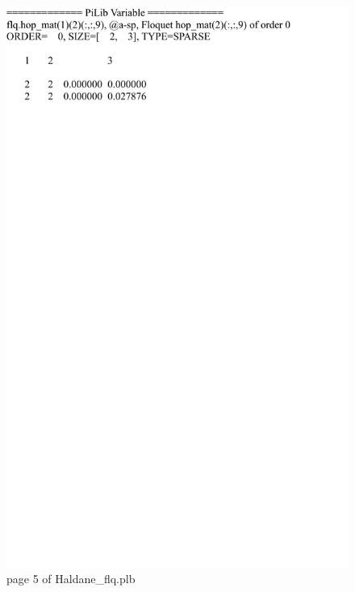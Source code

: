 \documentclass[10pt,a4paper]{article}
\begin{document}
\begin{figure}[tbp]
\centering
\includegraphics[width=0.85\columnwidth]{Haldane_flq_p5.pdf}
\caption{page 5 of Haldane\_flq.plb}
\end{figure}
\end{document}
